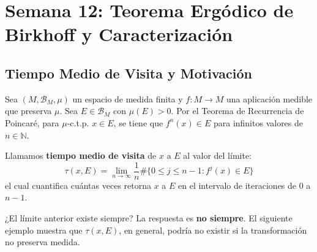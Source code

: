
\chapter{Semana 12: Teorema Ergódico de Birkhoff y Caracterización}

\section{Tiempo Medio de Visita y Motivación}

\begin{observacion}
	Sea $(M, \mathcal{B}_M, \mu)$ un espacio de medida finita y $f: M \to M$ una aplicación medible que preserva $\mu$. Sea $E \in \mathcal{B}_M$ con $\mu(E) > 0$. Por el Teorema de Recurrencia de Poincaré, para $\mu$-c.t.p. $x \in E$, se tiene que $f^n(x) \in E$ para infinitos valores de $n \in \mathbb{N}$.
	
	Llamamos \textbf{tiempo medio de visita} de $x$ a $E$ al valor del límite:
	$$ \tau(x, E) = \lim_{n \to \infty} \frac{1}{n} \# \{ 0 \le j \le n-1 : f^j(x) \in E \} $$
	el cual cuantifica cuántas veces retorna $x$ a $E$ en el intervalo de iteraciones de $0$ a $n-1$.
\end{observacion}

¿El límite anterior existe siempre? La respuesta es \textbf{no siempre}. El siguiente ejemplo muestra que $\tau(x, E)$, en general, podría no existir si la transformación no preserva medida.

